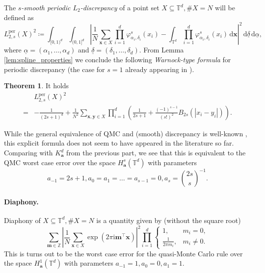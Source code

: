 \documentclass[a4paper,12pt]{article}
\numberwithin{equation}{section}
\theoremstyle{definition}
\newtheorem{thm}{Theorem}[section]
\newtheorem*{rem*}{Remark}
\newcommand{\ba}{\mathbf{a}}
\newcommand{\bm}{\mathbf{m}}
\newcommand{\bx}{\mathbf{x}}
\newcommand{\by}{\mathbf{y}}
\newcommand{\bbT}{\mathbb{T}}
\newcommand{\bbZ}{\mathbb{Z}}
\newcommand{\sbse}{\subseteq}
\newcommand{\iu}{\mathrm{i}}
\newcommand{\dx}{\text{d}}
\begin{document}
The \emph{$s$-smooth periodic $L_2$-discrepancy} of a point set $X \sbse \bbT^d, \#X = N$ will be defined as
$$
L_{2, s}^{\text{per}}(X)^2 \coloneqq \int_{[0, 1)^d} \int_{(0, 1]^d} \left|\frac1N \sum_{\bx \in X} \prod_{i=1}^d \varphi_{\alpha_i, \delta_i}^s(x_i) - \int_{\bbT^d}\prod_{i=1}^d \varphi_{\alpha_i, \delta_i}^s(x_i) \, \dx \bx \right|^2 \, \dx \underline{\delta} \, \dx \underline{\alpha},
$$
where $\underline{\alpha} = (\alpha_1, \dots, \alpha_d)$ and $\underline{\delta} = (\delta_1, \dots, \delta_d)$. From Lemma \ref{lem:spline_properties} we conclude the following \emph{Warnock-type formula} for periodic discrepancy (the case for $s=1$ already appearing in \cite{HKP21, HO16}).
\begin{thm} \label{thm:smooth_discr}
	It holds
	\begin{align*}
		& L_{2, s}^{\text{per}}(X)^2 \\
		= & -\frac1{(2s+1)^d} + \frac1{N^2} \sum_{\bx, \by \in X} \prod_{i=1}^d \left(\frac1{2s+1} + \frac{(-1)^{s-1}}{(s!)^2} B_{2s}(|x_i-y_i|)\right).
	\end{align*}
\end{thm}
While the general equivalence of QMC and (smooth) discrepancy is well-known \cite{Tem19}, this explicit formula does not seem to have appeared in the literature so far. Comparing with $K_\ba^d$ from the previous part, we see that this is equivalent to the QMC worst case error over the space $H_\ba^s(\bbT^d)$ with parameters
$$
a_{-1} = 2s+1, a_0 = a_1 = \dots = a_{s-1} = 0, a_s = {2s \choose s}^{-1}.
$$

\paragraph{Diaphony.} Diaphony \cite{Lev95, Zin76} of $X \sbse \bbT^d, \#X = N$ is a quantity given by (without the square root)
$$
\sum_{\bm \in \bbZ} \left|\frac1N \sum_{\bx \in X} \exp(2\pi\iu \bm^\top \bx)\right|^2 \prod_{i=1}^d \begin{cases}
	1, & m_i = 0, \\
	\frac1{2\pi m_i}, & m_i \neq 0.
\end{cases}
$$
This is turns out to be the worst case error for the quasi-Monte Carlo rule over the space $H^1_\ba(\bbT^d)$ with parameters $a_{-1}=1, a_0 = 0, a_{1} = 1$.
\end{document}
